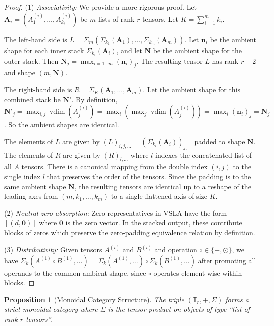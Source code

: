 \documentclass[11pt]{article}
\newtheorem{proposition}[theorem]{Proposition}
\newcommand{\vdim}{\operatorname{vdim}}
\begin{document}
\begin{proof}
(1) \emph{Associativity:} We provide a more rigorous proof. Let $\mathbf{A}_i = (A^{(i)}_1, \dots, A^{(i)}_{k_i})$ be $m$ lists of rank-$r$ tensors. Let $K = \sum_{i=1}^m k_i$. 

The left-hand side is $L = \Sigma_m(\Sigma_{k_1}(\mathbf{A}_1), \dots, \Sigma_{k_m}(\mathbf{A}_m))$. Let $\mathbf{n}_i$ be the ambient shape for each inner stack $\Sigma_{k_i}(\mathbf{A}_i)$, and let $\mathbf{N}$ be the ambient shape for the outer stack. Then $\mathbf{N}_j = \max_{i=1\dots m} (\mathbf{n}_i)_j$. The resulting tensor $L$ has rank $r+2$ and shape $(m, \mathbf{N})$.

The right-hand side is $R = \Sigma_K(\mathbf{A}_1, \dots, \mathbf{A}_m)$. Let the ambient shape for this combined stack be $\mathbf{N}'$. By definition, $\mathbf{N}'_j = \max_{i,j} \vdim(A^{(i)}_j) = \max_i (\max_j \vdim(A^{(i)}_j)) = \max_i (\mathbf{n}_i)_j = \mathbf{N}_j$. So the ambient shapes are identical.

The elements of $L$ are given by $(L)_{i,j,...} = (\Sigma_{k_i}(\mathbf{A}_i))_{j,...}$ padded to shape $\mathbf{N}$. The elements of $R$ are given by $(R)_{l,...}$ where $l$ indexes the concatenated list of all $A$ tensors. There is a canonical mapping from the double index $(i,j)$ to the single index $l$ that preserves the order of the tensors. Since the padding is to the same ambient shape $\mathbf{N}$, the resulting tensors are identical up to a reshape of the leading axes from $(m, k_1, \dots, k_m)$ to a single flattened axis of size $K$.

(2) \emph{Neutral-zero absorption:} Zero representatives in VSLA have the form $[(d, \mathbf{0})]$ where $\mathbf{0}$ is the zero vector. In the stacked output, these contribute blocks of zeros which preserve the zero-padding equivalence relation by definition.

(3) \emph{Distributivity:} Given tensors $A^{(i)}$ and $B^{(i)}$ and operation $\circ \in \{+, \odot\}$, we have $\Sigma_k(A^{(1)} \circ B^{(1)}, \ldots) = \Sigma_k(A^{(1)}, \ldots) \circ \Sigma_k(B^{(1)}, \ldots)$ after promoting all operands to the common ambient shape, since $\circ$ operates element-wise within blocks.
\end{proof}

\begin{proposition}[Monoidal Category Structure]
The triple $(\mathbb{T}_r, +, \Sigma)$ forms a \emph{strict monoidal category} where $\Sigma$ is the tensor product on objects of type ``list of rank-$r$ tensors''.
\end{proposition}
\end{document}
